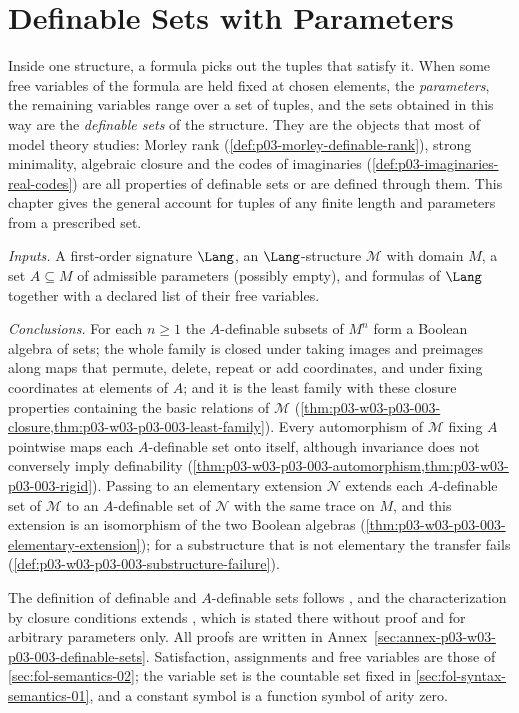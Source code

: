 \chapter{Definable Sets with Parameters}
\label{sec:p03-w03-p03-003-definable-sets}

Inside one structure, a formula picks out the tuples that satisfy it.  When
some free variables of the formula are held fixed at chosen elements, the
\emph{parameters}, the remaining variables range over a set of tuples, and the
sets obtained in this way are the \emph{definable sets} of the structure.
They are the objects that most of model theory studies: Morley rank
(\cref{def:p03-morley-definable-rank}), strong minimality, algebraic closure
and the codes of imaginaries (\cref{def:p03-imaginaries-real-codes}) are all
properties of definable sets or are defined through them.  This chapter gives
the general account for tuples of any finite length and parameters from a
prescribed set.

\emph{Inputs.}  A first-order signature \(\Lang\), an \(\Lang\)-structure
\(\mathcal M\) with domain \(M\), a set \(A\subseteq M\) of admissible
parameters (possibly empty), and formulas of \(\Lang\) together with a
declared list of their free variables.

\emph{Conclusions.}  For each \(n\geq1\) the \(A\)-definable subsets of
\(M^n\) form a Boolean algebra of sets; the whole family is closed under
taking images and preimages along maps that permute, delete, repeat or add
coordinates, and under fixing coordinates at elements of \(A\); and it is the
least family with these closure properties containing the basic relations of
\(\mathcal M\) (\cref{thm:p03-w03-p03-003-closure,thm:p03-w03-p03-003-least-family}).
Every automorphism of \(\mathcal M\) fixing \(A\) pointwise maps each
\(A\)-definable set onto itself, although invariance does not conversely
imply definability (\cref{thm:p03-w03-p03-003-automorphism,thm:p03-w03-p03-003-rigid}).
Passing to an elementary extension \(\mathcal N\) extends each \(A\)-definable
set of \(\mathcal M\) to an \(A\)-definable set of \(\mathcal N\) with the same
trace on \(M\), and this extension is an isomorphism of the two Boolean
algebras (\cref{thm:p03-w03-p03-003-elementary-extension}); for a substructure
that is not elementary the transfer fails
(\cref{def:p03-w03-p03-003-substructure-failure}).

The definition of definable and \(A\)-definable sets follows
\cite[p.~17]{Marker2000IntroductionModelTheory}, and the characterization by
closure conditions extends \cite[Proposition~1.3, p.~18]{Marker2000IntroductionModelTheory},
which is stated there without proof and for arbitrary parameters only.  All
proofs are written in Annex~\ref{sec:annex-p03-w03-p03-003-definable-sets}.
Satisfaction, assignments and free variables are those of
\cref{sec:fol-semantics-02}; the variable set is the countable set fixed in
\cref{sec:fol-syntax-semantics-01}, and a constant symbol is a function symbol
of arity zero.


